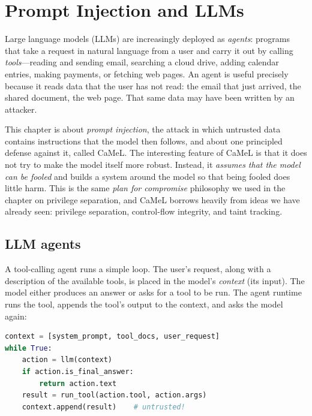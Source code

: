 \chapter{Prompt Injection and LLMs}
\label{chap:camel}


Large language models (LLMs) are increasingly deployed as \emph{agents}:
programs that take a request in natural language from a user and carry
it out by calling \emph{tools}---reading and sending email, searching
a cloud drive, adding calendar entries, making payments, or fetching web
pages.
An agent is useful precisely because it reads data that the user has not
read: the email that just arrived, the shared document, the web page.
That same data may have been written by an attacker.

This chapter is about \emph{prompt injection}, the attack in which
untrusted data contains instructions that the model then follows, and
about one principled defense against it, called
CaMeL.\autocite{debenedetti2025camel}
The interesting feature of CaMeL is that it does not try to make the
model itself more robust.
Instead, it \emph{assumes that the model can be fooled} and builds a
system around the model so that being fooled does little harm.
This is the same \emph{plan for compromise} philosophy we used in the
chapter on privilege separation, and CaMeL borrows heavily from ideas we
have already seen: privilege separation, control-flow integrity, and
taint tracking.

\section{LLM agents}

A tool-calling agent runs a simple loop.
The user's request, along with a description of the available tools, is
placed in the model's \emph{context} (its input).
The model either produces an answer or asks for a tool to be run.
The agent runtime runs the tool, appends the tool's output to the
context, and asks the model again:

\begin{lstlisting}[language=python,style=camel]
context = [system_prompt, tool_docs, user_request]
while True:
    action = llm(context)
    if action.is_final_answer:
        return action.text
    result = run_tool(action.tool, action.args)
    context.append(result)    # untrusted!
\end{lstlisting}

